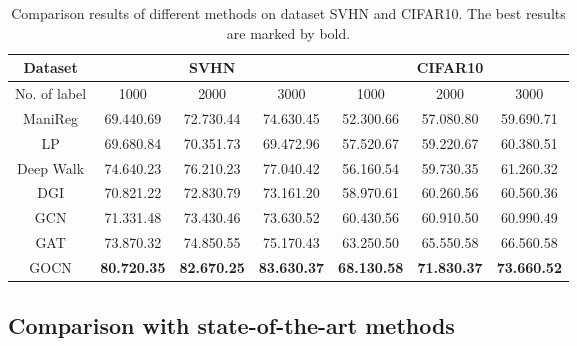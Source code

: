 \documentclass{article}
\begin{document}
\begin{table*}\small
\centering
\caption{\upshape Comparison results of different methods on dataset SVHN and CIFAR10. The best results are marked by bold.}
\begin{tabular}{c||c|c|c||c|c|c}
  \hline
  \hline
Dataset& \multicolumn{ 3}{c||}{SVHN} & \multicolumn{ 3}{c}{CIFAR10}\\
  \hline
  No. of label & 1000 & 2000 & 3000 & 1000 & 2000 & 3000 \\
  \hline
   ManiReg  & 69.440.69 & 72.730.44 & 74.630.45 & 52.300.66 & 57.080.80 & 59.690.71\\
   LP       & 69.680.84 & 70.351.73 & 69.472.96 & 57.520.67 & 59.220.67 & 60.380.51\\
   Deep Walk& 74.640.23 & 76.210.23 & 77.040.42 & 56.160.54 & 59.730.35 & 61.260.32\\
   DGI      & 70.821.22 & 72.830.79 & 73.161.20 & 58.970.61 & 60.260.56 & 60.560.36\\
   GCN      & 71.331.48 & 73.430.46 & 73.630.52 & 60.430.56 & 60.910.50 & 60.990.49\\
   GAT      & 73.870.32 & 74.850.55 & 75.170.43 & 63.250.50 & 65.550.58 & 66.560.58\\
   \hline
   GOCN     & \textbf{80.720.35} & \textbf{82.670.25} & \textbf{83.630.37} & \textbf{68.130.58} & \textbf{71.830.37} & \textbf{73.660.52}\\
  \hline
  \hline
\end{tabular}
\end{table*}
\subsection{Comparison with state-of-the-art methods}
\end{document}
